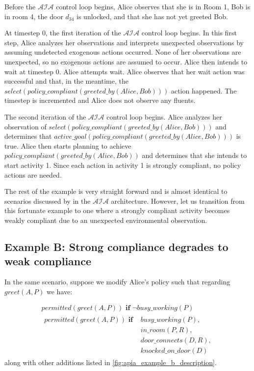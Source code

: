 Before the $\mathcal{AIA}$ control loop begins, Alice observes that she is in Room 1, Bob is in room 4, the door $d_{34}$ is unlocked, and that she has not yet greeted Bob.

At timestep 0, the first iteration of the $\mathcal{AIA}$ control loop begins.
In this first step, Alice analyzes her observations and interprets unexpected observations by assuming undetected exogenous actions occurred.
None of her observations are unexpected, so no exogenous actions are assumed to occur.
Alice then intends to wait at timestep 0.
Alice attempts wait.
Alice observes that her wait action was successful and that, in the meantime, the $select(policy\_compliant(greeted\_by(Alice, Bob)))$ action happened.
The timestep is incremented and Alice does not observe any fluents.

The second iteration of the $\mathcal{AIA}$ control loop begins.
Alice analyzes her observation of $select(policy\_compliant(greeted\_by(Alice, Bob)))$ and determines that $active\_goal(policy\_compliant(greeted\_by(Alice, Bob)))$ is true.
Alice then starts planning to achieve $policy\_compliant(greeted\_by(Alice, Bob))$ and determines that she intends to start activity 1.
Since each action in activity 1 is strongly compliant, no policy actions are needed.

The rest of the example is very straight forward and is almost identical to scenarios discussed by \citet{blount_architecture_2013,blount_towards_2014} in the $\mathcal{AIA}$ architecture.
However, let us transition from this fortunate example to one where a strongly compliant activity becomes weakly compliant due to an unexpected environmental observation.

\subsection{Example B: Strong compliance degrades to weak compliance}

In the same scenario, suppose we modify Alice's policy such that regarding $greet(A, P)$ we have:

\begin{gather}
    permitted(greet(A, P)) \textbf{ if }
        \neg busy\_working(P) \\
    \begin{split}
        permitted(greet(A, P)) \textbf{ if }
            & busy\_working(P), \\
            & in\_room(P, R), \\
            & door\_connects(D, R), \\
            & knocked\_on\_door(D)
    \end{split}
\end{gather}
along with other additions listed in \cref{fig:apia_example_b_description}.


